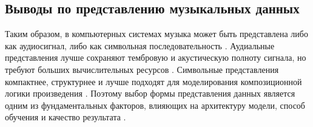 \documentclass[a4paper,12pt]{extarticle}
\begin{document}
\subsection{Выводы по представлению музыкальных данных}
\label{subsec:repr_conclusion}

Таким образом, в компьютерных системах музыка может быть представлена либо как аудиосигнал, либо как символьная последовательность \cite{briot2017deep,duan2025recent,ji2020comprehensive}. 
Аудиальные представления лучше сохраняют тембровую и акустическую полноту сигнала, но требуют больших вычислительных ресурсов \cite{ji2020comprehensive,duan2025recent}. 
Символьные представления компактнее, структурнее и лучше подходят для моделирования композиционной логики произведения \cite{ji2023symbolic,duan2025recent}. 
Поэтому выбор формы представления данных является одним из фундаментальных факторов, влияющих на архитектуру модели, способ обучения и качество результата \cite{briot2017deep,ji2020comprehensive,duan2025recent}. 
\end{document}
